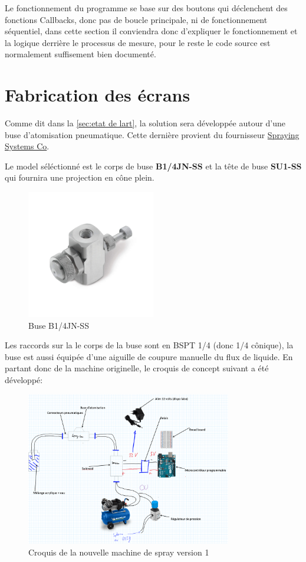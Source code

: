 Le fonctionnement du programme se base sur des boutons qui déclenchent des fonctions Callbacks, donc pas de boucle principale,
ni de fonctionnement séquentiel, dans cette section il conviendra donc d'expliquer le fonctionnement et la logique derrière le processus
de mesure, pour le reste le code source est normalement suffisement bien documenté.
\newpage

\section{Fabrication des écrans}
Comme dit dans la \autoref{sec:etat de lart}, la solution sera développée autour d'une buse d'atomisation pneumatique.
Cette dernière provient du fournisseur \href{https://www.spray.com/fr-eu}{Spraying Systems Co}\footnotemark.

Le model séléctionné est le corps de buse \textbf{B1/4JN-SS} et la tête de buse \textbf{SU1-SS } qui fournira une projection en cône plein.
\begin{figure}[H]
    \centering
    \includegraphics[width = 0.5\textwidth]{assets/figures/ameliorations/J_Series_1_8JN_and_1_4JN.jpeg}
    \caption[Buse B1/4JN-SS]{Buse B1/4JN-SS \cite{image_buse_spray_com}}
\end{figure}
Les raccords sur la le corps de la buse sont en BSPT 1/4 (donc 1/4 cônique), la buse est aussi équipée d'une aiguille de coupure manuelle du flux de liquide.
En partant donc de la machine originelle, le croquis de concept suivant a été développé:
\begin{figure}[H]
    \centering
    \includegraphics[width = 0.8\textwidth]{assets/figures/ameliorations/Croquis_machine_ecran_ver_1.png}
    \caption[Croquis nouvelle machine de spray ver. 1]{Croquis de la nouvelle machine de spray version 1}
\end{figure}


